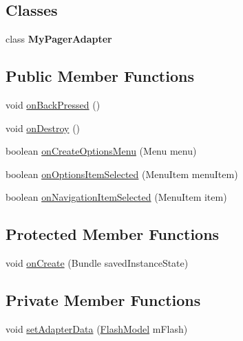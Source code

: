 \subsection*{Classes}
\begin{DoxyCompactItemize}
\item 
class {\bfseries My\+Pager\+Adapter}
\end{DoxyCompactItemize}
\subsection*{Public Member Functions}
\begin{DoxyCompactItemize}
\item 
void \hyperlink{classorg_1_1buildmlearn_1_1learnwithflashcards_1_1activities_1_1MainActivity_aba0b9fc188e6e4c0496701a2bd6e99e0}{on\+Back\+Pressed} ()
\item 
void \hyperlink{classorg_1_1buildmlearn_1_1learnwithflashcards_1_1activities_1_1MainActivity_aa158542acdf041a4f1844249b26976d4}{on\+Destroy} ()
\item 
boolean \hyperlink{classorg_1_1buildmlearn_1_1learnwithflashcards_1_1activities_1_1MainActivity_a10a4b71a49744f315daea5d86f1ab689}{on\+Create\+Options\+Menu} (Menu menu)
\item 
boolean \hyperlink{classorg_1_1buildmlearn_1_1learnwithflashcards_1_1activities_1_1MainActivity_a584091a40296c515ffe7a34e2a0e041a}{on\+Options\+Item\+Selected} (Menu\+Item menu\+Item)
\item 
boolean \hyperlink{classorg_1_1buildmlearn_1_1learnwithflashcards_1_1activities_1_1MainActivity_aeb380a0de53bf93a8cc0db494979f96f}{on\+Navigation\+Item\+Selected} (Menu\+Item item)
\end{DoxyCompactItemize}
\subsection*{Protected Member Functions}
\begin{DoxyCompactItemize}
\item 
void \hyperlink{classorg_1_1buildmlearn_1_1learnwithflashcards_1_1activities_1_1MainActivity_ae52b3ab6cbde558c7d1cfbf3b7b4f411}{on\+Create} (Bundle saved\+Instance\+State)
\end{DoxyCompactItemize}
\subsection*{Private Member Functions}
\begin{DoxyCompactItemize}
\item 
void \hyperlink{classorg_1_1buildmlearn_1_1learnwithflashcards_1_1activities_1_1MainActivity_aaec59a3341d791fd02af36e47b68625d}{set\+Adapter\+Data} (\hyperlink{classorg_1_1buildmlearn_1_1learnwithflashcards_1_1data_1_1FlashModel}{Flash\+Model} m\+Flash)
\end{DoxyCompactItemize}
